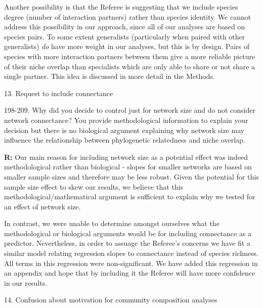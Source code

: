 \documentclass[12pt]{letter}
\newenvironment{refquote}{\bigskip \begin{it}}{\end{it}\smallskip}
\begin{document}
		Another possibility is that the Referee is suggesting that we include species degree (number of interaction partners) rather than species identity. We cannot address this possibility in our approach, since all of our analyses are based on species pairs. To some extent generalists (particularly when paired with other generalists) \emph{do} have more weight in our analyses, but this is by design. Pairs of species with more interaction partners between them give a more reliable picture of their niche overlap than specialists which are only able to share or not share a single partner. This idea is discussed in more detail in the Methods. 


	13. Request to include connectance

		\begin{refquote}
			198-209. Why did you decide to control just for network size and do not consider network connectance? You provide methodological information to explain your decision but there is no biological argument explaining why network size may influence the relationship between phylogenetic relatedness and niche overlap.
		\end{refquote}

		\textbf{R:} Our main reason for including network size as a potential effect was indeed methodological rather than biological - slopes for smaller networks are based on smaller sample sizes and therefore may be less robust. 
		Given the potential for this sample size effect to skew our results, we believe that this methodological/mathematical argument is sufficient to explain why we tested for an effect of network size.


		In contrast, we were unable to determine amongst ourselves what the methodological or biological arguments would be for including connectance as a predictor. Nevertheless, in order to assuage the Referee's concerns we have fit a similar model relating regression slopes to connectance instead of species richness. All terms in this regression were non-significant. We have added this regression in an appendix and hope that by including it the Referee will have more confidence in our results.


	14. Confusion about motivation for community composition analyses 
\end{document}
